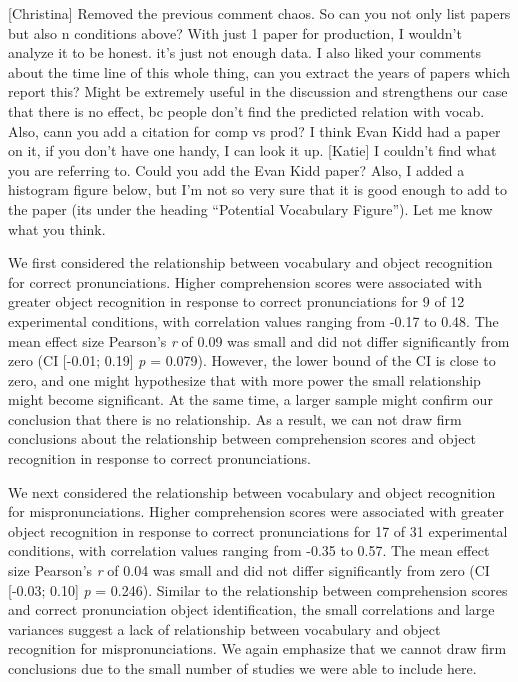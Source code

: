 \documentclass[man]{apa6}
\theoremstyle{definition}
\theoremstyle{definition}
\theoremstyle{definition}
\theoremstyle{remark}
\begin{document}
{[}Christina{]} Removed the previous comment chaos. So can you not only
list papers but also n conditions above? With just 1 paper for
production, I wouldn't analyze it to be honest. it's just not enough
data. I also liked your comments about the time line of this whole
thing, can you extract the years of papers which report this? Might be
extremely useful in the discussion and strengthens our case that there
is no effect, bc people don't find the predicted relation with vocab.
Also, cann you add a citation for comp vs prod? I think Evan Kidd had a
paper on it, if you don't have one handy, I can look it up. {[}Katie{]}
I couldn't find what you are referring to. Could you add the Evan Kidd
paper? Also, I added a histogram figure below, but I'm not so very sure
that it is good enough to add to the paper (its under the heading
\enquote{Potential Vocabulary Figure}). Let me know what you think.

We first considered the relationship between vocabulary and object
recognition for correct pronunciations. Higher comprehension scores were
associated with greater object recognition in response to correct
pronunciations for 9 of 12 experimental conditions, with correlation
values ranging from -0.17 to 0.48. The mean effect size Pearson's
\emph{r} of 0.09 was small and did not differ significantly from zero
(CI {[}-0.01; 0.19{]} \emph{p} = 0.079). However, the lower bound of the
CI is close to zero, and one might hypothesize that with more power the
small relationship might become significant. At the same time, a larger
sample might confirm our conclusion that there is no relationship. As a
result, we can not draw firm conclusions about the relationship between
comprehension scores and object recognition in response to correct
pronunciations.

We next considered the relationship between vocabulary and object
recognition for mispronunciations. Higher comprehension scores were
associated with greater object recognition in response to correct
pronunciations for 17 of 31 experimental conditions, with correlation
values ranging from -0.35 to 0.57. The mean effect size Pearson's
\emph{r} of 0.04 was small and did not differ significantly from zero
(CI {[}-0.03; 0.10{]} \emph{p} = 0.246). Similar to the relationship
between comprehension scores and correct pronunciation object
identification, the small correlations and large variances suggest a
lack of relationship between vocabulary and object recognition for
mispronunciations. We again emphasize that we cannot draw firm
conclusions due to the small number of studies we were able to include
here.
\end{document}
